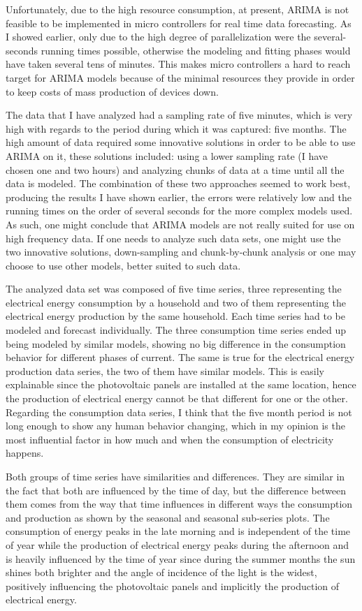 \documentclass[12pt,a4paper,titlepage]{report}
\begin{document}
Unfortunately, due to the high resource consumption, at present, ARIMA is not feasible to be implemented in micro controllers for real time data forecasting. As I showed earlier, only due to the high degree of parallelization were the several-seconds running times possible, otherwise the modeling and fitting phases would have taken several tens of minutes. This makes micro controllers a hard to reach target for ARIMA models because of the minimal resources they provide in order to keep costs of mass production of devices down.

The data that I have analyzed had a sampling rate of five minutes, which is very high with regards to the period during which it was captured: five months. The high amount of data required some innovative solutions in order to be able to use ARIMA on it, these solutions included: using a lower sampling rate (I have chosen one and two hours) and analyzing chunks of data at a time until all the data is modeled. The combination of these two approaches seemed to work best, producing the results I have shown earlier, the errors were relatively low and the running times on the order of several seconds for the more complex models used. As such, one might conclude that ARIMA models are not really suited for use on high frequency data. If one needs to analyze such data sets, one might use the two innovative solutions, down-sampling and chunk-by-chunk analysis or one may choose to use other models, better suited to such data.

The analyzed data set was composed of five time series, three representing the electrical energy consumption by a household and two of them representing the electrical energy production by the same household. Each time series had to be modeled and forecast individually. The three consumption time series ended up being modeled by similar models, showing no big difference in the consumption behavior for different phases of current. The same is true for the electrical energy production data series, the two of them have similar models. This is easily explainable since the photovoltaic panels are installed at the same location, hence the production of electrical energy cannot be that different for one or the other. Regarding the consumption data series, I think that the five month period is not long enough to show any human behavior changing, which in my opinion is the most influential factor in how much and when the consumption of electricity happens.

Both groups of time series have similarities and differences. They are similar in the fact that both are influenced by the time of day, but the difference between them comes from the way that time influences in different ways the consumption and production as shown by the seasonal and seasonal sub-series plots. The consumption of energy peaks in the late morning and is independent of the time of year while the production of electrical energy peaks during the afternoon and is heavily influenced by the time of year since during the summer months the sun shines both brighter and the angle of incidence of the light is the widest, positively influencing the photovoltaic panels and implicitly the production of electrical energy.
\end{document}

